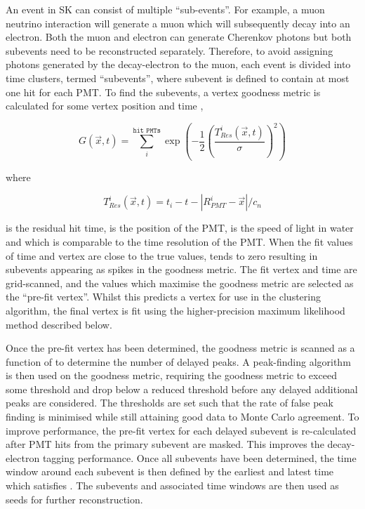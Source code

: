 An event in SK can consist of multiple ``sub-events''. For example, a muon neutrino interaction will generate a muon which will subsequently decay into an electron. Both the muon and electron can generate Cherenkov photons but both subevents need to be reconstructed separately. Therefore, to avoid assigning photons generated by the decay-electron to the muon, each event is divided into time clusters, termed ``subevents'', where subevent is defined to contain at most one hit for each PMT. To find the subevents, a vertex goodness metric is calculated for some vertex position  and time ,

\begin{equation}
  G(\vec{x},t) = \sum^{\texttt{hit PMTs}}_{i} \exp \left( - \frac{1}{2} \left( \frac{T_{Res}^{i}(\vec{x},t)}{\sigma} \right)^{2} \right)
\end{equation}

where

\begin{equation}
  T_{Res}^{i}(\vec{x},t) = t_{i} - t - \left| R^{i}_{PMT} - \vec{x} \right|/c_{n}
\end{equation}

is the residual hit time,  is the position of the  PMT,  is the speed of light in water and  which is comparable to the time resolution of the PMT. When the fit values of time and vertex are close to the true values,  tends to zero resulting in subevents appearing as spikes in the goodness metric. The fit vertex and time are grid-scanned, and the values which maximise the goodness metric are selected as the ``pre-fit vertex''. Whilst this predicts a vertex for use in the clustering algorithm, the final vertex is fit using the higher-precision maximum likelihood method described below.

Once the pre-fit vertex has been determined, the goodness metric is scanned as a function of  to determine the number of delayed peaks. A peak-finding algorithm is then used on the goodness metric, requiring the goodness metric to exceed some threshold and drop below a reduced threshold before any delayed additional peaks are considered. The thresholds are set such that the rate of false peak finding is minimised while still attaining good data to Monte Carlo agreement. To improve performance, the pre-fit vertex for each delayed subevent is re-calculated after PMT hits from the primary subevent are masked. This improves the decay-electron tagging performance. Once all subevents have been determined, the time window around each subevent is then defined by the earliest and latest time which satisfies . The subevents and associated time windows are then used as seeds for further reconstruction.

